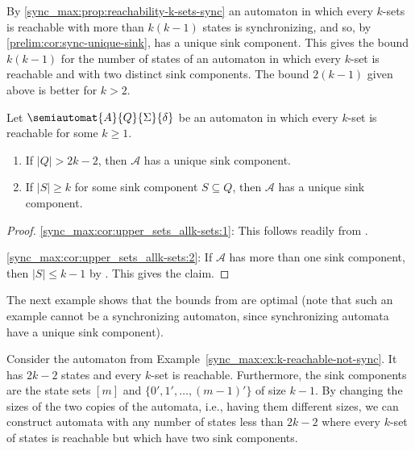 By \cref{sync_max:prop:reachability-k-sets-sync}
an automaton in which every $k$-sets is reachable with more than $k(k-1)$
states is synchronizing, and so, by \cref{prelim:cor:sync-unique-sink}, has a unique sink component.
This gives the bound $k(k-1)$ for the number of states
of an automaton in which every $k$-set is reachable
and with two distinct sink components. The bound $2(k-1)$ given above is better for $k > 2$.

\begin{corollary} \label{sync_max:cor:upper_sets_allk-sets}
	Let $\semiautomat{A}{Q}{\Sigma}{\delta}$
	be an automaton in which every $k$-set is reachable for some $k \ge 1$.
	
	\begin{enumerate}
		\item \label{sync_max:cor:upper_sets_allk-sets:1} If $|Q| > 2k - 2$, then $\mathcal A$ has a unique sink component.
		
		\item \label{sync_max:cor:upper_sets_allk-sets:2} If $|S| \ge k$ for some sink component $S \subseteq Q$, then $\mathcal A$ has a unique sink component.
	\end{enumerate}
\end{corollary}
\begin{proof} 
	\ref{sync_max:cor:upper_sets_allk-sets:1}: This follows readily from .
	
	\ref{sync_max:cor:upper_sets_allk-sets:2}: If $\mathcal A$ has more than one sink component,
	then $|S| \le k - 1$ by .
	This gives the claim.	
\end{proof}

The next example shows that the bounds from 
are optimal (note that such an example cannot be a synchronizing automaton, since synchronizing automata have a unique sink component).

\begin{example}
	Consider the automaton from Example~\ref{sync_max:ex:k-reachable-not-sync}.
	It has $2k - 2$ states and every $k$-set is reachable.
	Furthermore, the sink components are the state sets $[m]$ and $\{0',1',\ldots,(m-1)'\}$
	of size $k - 1$. By changing the sizes of the two copies of the \Cerny automata, i.e., having them different sizes,
	we can construct automata with any number
	of states less than $2k - 2$ where every $k$-set of states
	is reachable but which have two sink components.
\end{example}